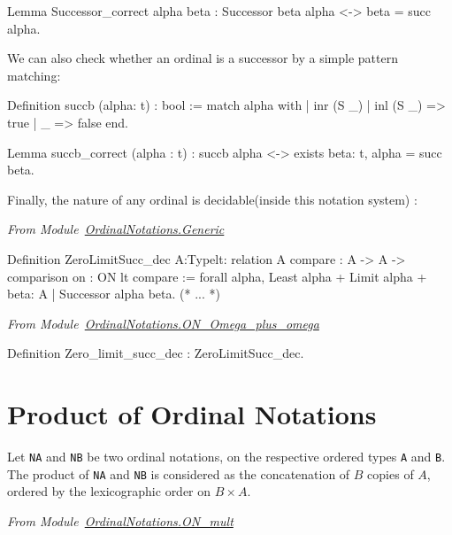 \begin{Coqsrc}
Lemma Successor_correct alpha beta : Successor beta alpha <->
                                     beta = succ alpha.
\end{Coqsrc}

We can also check whether an ordinal is a successor by a simple pattern matching:

\begin{Coqsrc}
Definition succb (alpha: t) : bool := match alpha with
                                 | inr (S  _) | inl (S _) => true
                                 | _ => false
                                 end.

Lemma succb_correct (alpha : t) :
    succb alpha <->  exists beta: t, alpha = succ beta.
\end{Coqsrc}


Finally, the nature of any ordinal is decidable(inside this notation system) :

\noindent\emph{From Module~\href{../theories/html/hydras.OrdinalNotations.Generic.html}{OrdinalNotations.Generic}}
\begin{Coqsrc}
  Definition ZeroLimitSucc_dec {A:Type}{lt: relation A}
           {compare : A -> A -> comparison}
           {on : ON lt compare} :=
  forall alpha,
    {Least alpha} +
    {Limit alpha} +
    {beta: A | Successor alpha beta}.
(* ... *)
\end{Coqsrc}

\noindent\emph{From Module~\href{../theories/html/hydras.OrdinalNotations.ON_Omega_plus_omega.html}{OrdinalNotations.ON\_Omega\_plus\_omega}}

\begin{Coqsrc}
Definition Zero_limit_succ_dec : ZeroLimitSucc_dec.
\end{Coqsrc}

\section{Product of Ordinal Notations}

Let \texttt{NA} and \texttt{NB} be two ordinal notations, on the respective  ordered types \texttt{A} and \texttt{B}. The product of \texttt{NA} and \texttt{NB} is considered as the concatenation of $B$ copies of $A$, ordered by the lexicographic order on $B\times A$.

\vspace{4pt}
\noindent
\emph{From Module~\href{../theories/html/hydras.OrdinalNotations.ON_mult.html}{OrdinalNotations.ON\_mult}}

